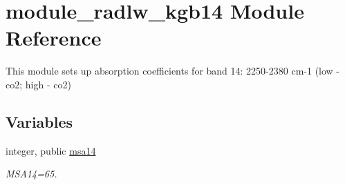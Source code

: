 \hypertarget{namespacemodule__radlw__kgb14}{}\section{module\+\_\+radlw\+\_\+kgb14 Module Reference}
\label{namespacemodule__radlw__kgb14}


This module sets up absorption coefficients for band 14\+: 2250-\/2380 cm-\/1 (low -\/ co2; high -\/ co2)  


\subsection*{Variables}
\begin{DoxyCompactItemize}
\item 
\mbox{\label{namespacemodule__radlw__kgb14_a9357fbaa5663438f0c0062a45c99a8d4}} 
integer, public \hyperlink{namespacemodule__radlw__kgb14_a9357fbaa5663438f0c0062a45c99a8d4}{msa14}
\begin{DoxyCompactList}\small\item\em M\+S\+A14=65. \end{DoxyCompactList}\end{DoxyCompactItemize}
